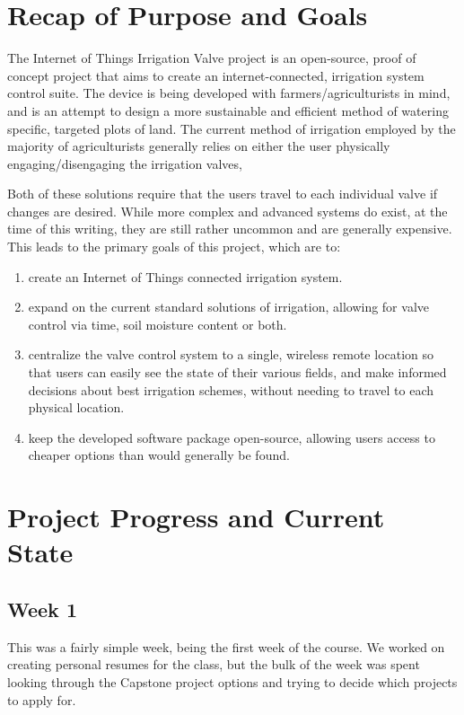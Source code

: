 \documentclass[onecolumn, draftclsnofoot,10pt, compsoc]{IEEEtran}
\begin{document}
    \section{Recap of Purpose and Goals}
    The Internet of Things Irrigation Valve project is an open-source, proof of concept project that aims to create an internet-connected, irrigation system control suite.
    The device is being developed with farmers/agriculturists in mind, and is an attempt to design a more sustainable and efficient method of watering specific, targeted plots of land.
    The current method of irrigation employed by the majority of agriculturists generally relies on either the user physically engaging/disengaging the irrigation valves,
    
    Both of these solutions require that the users travel to each individual valve if changes are desired.
    While more complex and advanced systems do exist, at the time of this writing, they are still rather uncommon and are generally expensive.
    This leads to the primary goals of this project, which are to:
    \begin{enumerate}
    \item create an Internet of Things connected irrigation system. 
    \item expand on the current standard solutions of irrigation, allowing for valve control via time, soil moisture content or both.
    \item centralize the valve control system to a single, wireless remote location so that users can easily see the state of their various fields, and make informed decisions about best irrigation schemes, without needing to travel to each physical location.
    \item keep the developed software package open-source, allowing users access to cheaper options than would generally be found.
    \end{enumerate}

    \section{Project Progress and Current State}
    \subsection{Week 1}
    This was a fairly simple week, being the first week of the course.
    We worked on creating personal resumes for the class, but the bulk of the week was spent looking through the Capstone project options and trying to decide which projects to apply for. 
    
\end{document}
